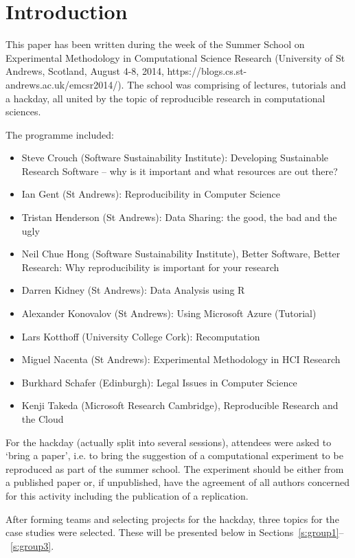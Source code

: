 \section{Introduction}
\label{s:intro}

This paper has been written during the week of the Summer School
on Experimental Methodology in Computational Science Research
(University of St Andrews, Scotland, August 4-8, 2014,
https://blogs.cs.st-andrews.ac.uk/emcsr2014/). The 
school was comprising of lectures, tutorials and a hackday,
all united by the topic of reproducible research in computational
sciences. 

The programme included:

\begin{itemize}
   \item Steve Crouch (Software Sustainability Institute): Developing Sustainable Research Software -- why is it important and what resources are out there?
   \item Ian Gent (St Andrews): Reproducibility in Computer Science
   \item Tristan Henderson (St Andrews): Data Sharing: the good, the bad and the ugly
    \item Neil Chue Hong (Software Sustainability Institute), Better Software, Better Research: Why reproducibility is important for your research
    \item Darren Kidney (St Andrews): Data Analysis using R
    \item Alexander Konovalov (St Andrews): Using Microsoft Azure (Tutorial)
    \item Lars Kotthoff (University College Cork): Recomputation
    \item Miguel Nacenta (St Andrews): Experimental Methodology in HCI Research
    \item Burkhard Schafer (Edinburgh): Legal Issues in Computer Science
    \item Kenji Takeda (Microsoft Research Cambridge), Reproducible Research and the Cloud
\end{itemize}

For the hackday (actually split into several sessions), attendees 
were asked to `bring a paper', i.e. to bring the suggestion of a 
computational experiment to be reproduced as part of the summer school. 
The experiment should be either from a published paper or, if unpublished, 
have the agreement of all authors concerned for this activity including 
the publication of a replication. 

After forming teams and selecting projects for the hackday, three
topics for the case studies were selected. These will be presented below
in Sections~\ref{s:group1}--~\ref{s:group3}.



